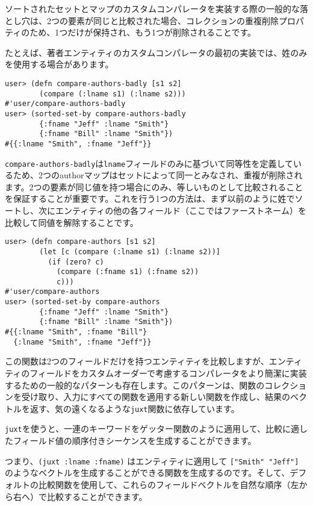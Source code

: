 ソートされたセットとマップのカスタムコンパレータを実装する際の一般的な落とし穴は、2つの要素が同じと比較された場合、コレクションの重複削除プロパティのため、1つだけが保持され、もう1つが削除されることです。

たとえば、著者エンティティのカスタムコンパレータの最初の実装では、姓のみを使用する場合があります。

\begin{lstlisting}[numbers=none]
user> (defn compare-authors-badly [s1 s2]
        (compare (:lname s1) (:lname s2)))
#'user/compare-authors-badly
user> (sorted-set-by compare-authors-badly
        {:fname "Jeff" :lname "Smith"}
        {:fname "Bill" :lname "Smith"})
#{{:lname "Smith", :fname "Jeff"}}
\end{lstlisting}

\texttt{compare-authors-badly}は\texttt{lname}フィールドのみに基づいて同等性を定義しているため、2つのauthorマップはセットによって同一とみなされ、重複が削除されます。2つの要素が同じ値を持つ場合にのみ、等しいものとして比較されることを保証することが重要です。これを行う1つの方法は、まず以前のように姓でソートし、次にエンティティの他の各フィールド（ここではファーストネーム）を比較して同値を解除することです。

\begin{lstlisting}[numbers=none]
user> (defn compare-authors [s1 s2]
        (let [c (compare (:lname s1) (:lname s2))]
          (if (zero? c)
            (compare (:fname s1) (:fname s2))
            c)))
#'user/compare-authors
user> (sorted-set-by compare-authors
        {:fname "Jeff" :lname "Smith"}
        {:fname "Bill" :lname "Smith"})
#{{:lname "Smith", :fname "Bill"}
  {:lname "Smith", :fname "Jeff"}}
\end{lstlisting}

この関数は2つのフィールドだけを持つエンティティを比較しますが、エンティティのフィールドをカスタムオーダーで考慮するコンパレータをより簡潔に実装するための一般的なパターンも存在します。このパターンは、関数のコレクションを受け取り、入力にすべての関数を適用する新しい関数を作成し、結果のベクトルを返す、気の遠くなるような\texttt{juxt}関数に依存しています。

\texttt{juxt}を使うと、一連のキーワードをゲッター関数のように適用して、比較に適したフィールド値の順序付きシーケンスを生成することができます。

つまり、\texttt{(juxt :lname :fname)} はエンティティに適用して \texttt{["Smith" "Jeff"]} のようなベクトルを生成することができる関数を生成するのです。そして、デフォルトの比較関数を使用して、これらのフィールドベクトルを自然な順序（左から右へ）で比較することができます。

